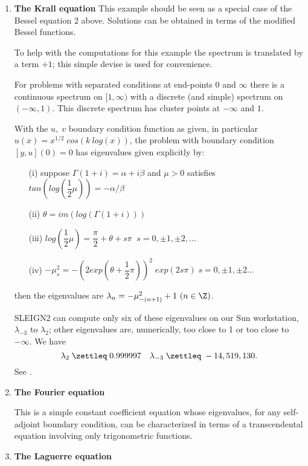 \begin{enumerate}
\item %

{ \bf The Krall equation}
This example should be seen as a special case of the Bessel equation 2
above. Solutions can be obtained in terms of the modified Bessel
functions.

To help with the computations for this example the spectrum is
translated by a term $+1$; this simple devise is used for convenience. 

For problems with separated conditions at end-points $0$ and $\infty $
there is a continuous spectrum on $[1, \infty )$ with a discrete (and
simple) spectrum on $(- \infty , 1)$.  This discrete spectrum has
cluster points at $- \infty $ and $1$.

With the $u, \; v$ boundary condition function as given, in particular
$u(x) = x^{1/2} \; cos (k \ log(x))$, the problem with boundary
condition $[y, u](0) = 0$ has eigenvalues given explicitly by:
\begin{itemize}
\item[(i)]
suppose $\Gamma (1+i) = \alpha + i \beta $ and $ \mu > 0$ satisfies $
tan(log (\dfrac{1}{2} \mu )) = - \alpha / \beta $
\item[(ii)]
$\theta = im (log ( \Gamma (1+i))) $
\item[(iii)]
$log (\dfrac{1}{2} \mu ) = \dfrac{\pi}{2} + \theta + s \pi \; \; s = 0,
\pm 1, \pm 2, ... $
\item[(iv)]
$- \mu_s^2 = - (2exp (\theta + \dfrac{1}{2} \pi ))^2 \; exp (2s \pi ) \;
s=0, \pm 1 , \pm 2 ... $
\end{itemize}
then the eigenvalues are $ \lambda_n = - \mu_{-(n+1)}^2 + 1 \ (n\in
\Z )$.

SLEIGN2 can compute only six of these eigenvalues on our Sun workstation, 
$\lambda_{-3}$ to
$\lambda_2 $; other eigenvalues are, numerically, too close to 1 or too close to 
$-\infty $.  We have $$ \lambda_2 \; \zettleq \; 0.999997  \quad 
\lambda_{-3} \; \zettleq \; -14,519,130. $$  See \cite{K}.

\item %

{\bf The Fourier equation}

This is a simple constant coefficient equation whose eigenvalues, for any 
self-adjoint boundary condition, can be characterized in terms of a transcendental 
equation involving only trigonometric functions.

\item %

{\bf The Laguerre equation}


\end{enumerate}
